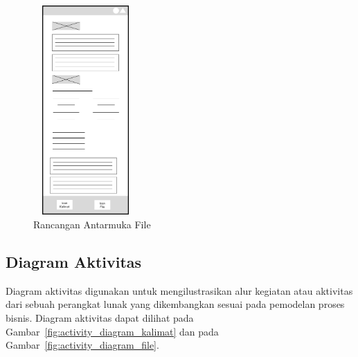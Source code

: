 \begin{figure}[H]
  \centering
  \includegraphics[width=4cm, height=8cm]{assets/rancangan_interface_file.png}
  \caption{Rancangan Antarmuka File}
  \label{fig:rancangan_interface_file}
\end{figure}

\subsection{Diagram Aktivitas}
Diagram aktivitas digunakan untuk mengilustrasikan alur kegiatan atau aktivitas dari sebuah
perangkat lunak yang dikembangkan sesuai pada pemodelan proses bisnis. Diagram aktivitas dapat dilihat
pada Gambar~\ref{fig:activity_diagram_kalimat} dan pada Gambar~\ref{fig:activity_diagram_file}.

